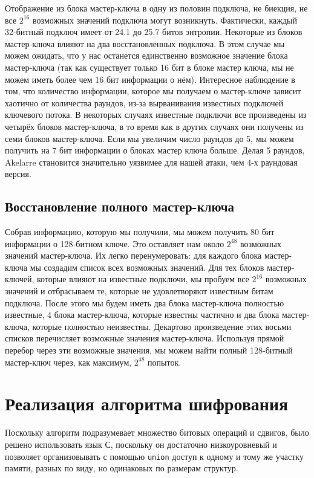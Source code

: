 \documentclass[12pt, a4paper]{article}
\begin{document}
Отображение из блока мастер-ключа в одну из половин подключа, не биекция, не все $2^16$ возможных значений подключа могут возникнуть. Фактически, каждый 32-битный подключ имеет от 24.1 до 25.7 битов энтропии. Некоторые из блоков мастер-ключа влияют на два восстановленных подключа. В этом случае мы можем ожидать, что у нас останется единственно возможное значение блока мастер-ключа (так как существует только 16 бит в блоке мастер ключа, мы не можем иметь более чем 16 бит информации о нём).
Интересное наблюдение в том, что количество информации, которое мы получаем о мастер-ключе зависит хаотично от количества раундов, из-за вырванивания известных подключей ключевого потока. В некоторых случаях известные подключи все произведены из четырёх блоков мастер-ключа, в то время как в других случаях они получены из семи блоков мастер-ключа. Если мы увеличим число раундов до 5, мы можем получить на 7 бит информации о блоках мастер ключа больше. Делая 5 раундов, Akelarre становится значительно уязвимее для нашей атаки, чем 4-х раундовая версия.

\subsection{Восстановление полного мастер-ключа}

Собрав информацию, которую мы получили, мы можем получить 80 бит информации о 128-битном ключе. Это оставляет нам около $2^{48}$ возможных значений мастер-ключа. Их легко перенумеровать: для каждого блока мастер-ключа мы создадим список всех возможных значений. Для тех блоков мастер-ключей, которые влияют на известные подключи, мы пробуем все $2^{16}$ возможных значений и отбрасываем те, которые не удовлетворяют известным битам подключа. После этого мы будем иметь два блока мастер-ключа полностью известные, 4 блока мастер-ключа, которые известны частично и два блока мастер-ключа, которые полностью неизвестны. Декартово произведение этих восьми списков перечисляет возможные значения мастер-ключа. Используя прямой перебор через эти возможные значения, мы можем найти полный 128-битный мастер-ключ через, как максимум, $2^{48}$ попыток.

\section{Реализация алгоритма шифрования}

Поскольку алгоритм подразумевает множество битовых операций и сдвигов, было решено использовать язык С, поскольку он достаточно низкоуровневый и позволяет организовывать с помощью \lstinline{union} доступ к одному и тому же участку памяти, разных по виду, но одинаковых по размерам структур.
\end{document}
